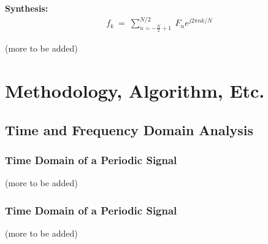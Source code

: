 \documentclass[10pt]{article}
\begin{document}
\textbf{Synthesis:}
\begin{equation} \label{eq:3.5.1}
\begin{aligned}
    f_k \: = \: \sum_{n=-\frac{N}{2}+1}^{N/2} \: F_n e^{j2\pi nk/ N}
\end{aligned}
\end{equation}


\noindent(more to be added)


\vspace{2cm}




\section{Methodology, Algorithm, Etc.}

\subsection{Time and Frequency Domain Analysis}

\subsubsection{Time Domain of a Periodic Signal}

\noindent(more to be added)

\subsubsection{Time Domain of a Periodic Signal}

\noindent(more to be added)
\end{document}
